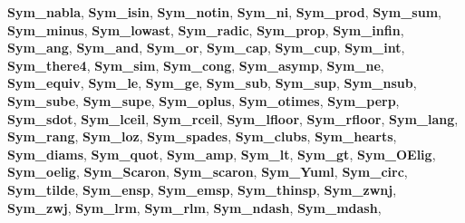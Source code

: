 \begin{DoxyCompactItemize}
{\bfseries Sym\+\_\+nabla}, 
{\bfseries Sym\+\_\+isin}, 
{\bfseries Sym\+\_\+notin}, 
{\bfseries Sym\+\_\+ni}, 
\newline
{\bfseries Sym\+\_\+prod}, 
{\bfseries Sym\+\_\+sum}, 
{\bfseries Sym\+\_\+minus}, 
{\bfseries Sym\+\_\+lowast}, 
\newline
{\bfseries Sym\+\_\+radic}, 
{\bfseries Sym\+\_\+prop}, 
{\bfseries Sym\+\_\+infin}, 
{\bfseries Sym\+\_\+ang}, 
\newline
{\bfseries Sym\+\_\+and}, 
{\bfseries Sym\+\_\+or}, 
{\bfseries Sym\+\_\+cap}, 
{\bfseries Sym\+\_\+cup}, 
\newline
{\bfseries Sym\+\_\+int}, 
{\bfseries Sym\+\_\+there4}, 
{\bfseries Sym\+\_\+sim}, 
{\bfseries Sym\+\_\+cong}, 
\newline
{\bfseries Sym\+\_\+asymp}, 
{\bfseries Sym\+\_\+ne}, 
{\bfseries Sym\+\_\+equiv}, 
{\bfseries Sym\+\_\+le}, 
\newline
{\bfseries Sym\+\_\+ge}, 
{\bfseries Sym\+\_\+sub}, 
{\bfseries Sym\+\_\+sup}, 
{\bfseries Sym\+\_\+nsub}, 
\newline
{\bfseries Sym\+\_\+sube}, 
{\bfseries Sym\+\_\+supe}, 
{\bfseries Sym\+\_\+oplus}, 
{\bfseries Sym\+\_\+otimes}, 
\newline
{\bfseries Sym\+\_\+perp}, 
{\bfseries Sym\+\_\+sdot}, 
{\bfseries Sym\+\_\+lceil}, 
{\bfseries Sym\+\_\+rceil}, 
\newline
{\bfseries Sym\+\_\+lfloor}, 
{\bfseries Sym\+\_\+rfloor}, 
{\bfseries Sym\+\_\+lang}, 
{\bfseries Sym\+\_\+rang}, 
\newline
{\bfseries Sym\+\_\+loz}, 
{\bfseries Sym\+\_\+spades}, 
{\bfseries Sym\+\_\+clubs}, 
{\bfseries Sym\+\_\+hearts}, 
\newline
{\bfseries Sym\+\_\+diams}, 
{\bfseries Sym\+\_\+quot}, 
{\bfseries Sym\+\_\+amp}, 
{\bfseries Sym\+\_\+lt}, 
\newline
{\bfseries Sym\+\_\+gt}, 
{\bfseries Sym\+\_\+\+O\+Elig}, 
{\bfseries Sym\+\_\+oelig}, 
{\bfseries Sym\+\_\+\+Scaron}, 
\newline
{\bfseries Sym\+\_\+scaron}, 
{\bfseries Sym\+\_\+\+Yuml}, 
{\bfseries Sym\+\_\+circ}, 
{\bfseries Sym\+\_\+tilde}, 
\newline
{\bfseries Sym\+\_\+ensp}, 
{\bfseries Sym\+\_\+emsp}, 
{\bfseries Sym\+\_\+thinsp}, 
{\bfseries Sym\+\_\+zwnj}, 
\newline
{\bfseries Sym\+\_\+zwj}, 
{\bfseries Sym\+\_\+lrm}, 
{\bfseries Sym\+\_\+rlm}, 
{\bfseries Sym\+\_\+ndash}, 
\newline
{\bfseries Sym\+\_\+mdash}, 

\end{DoxyCompactItemize}

